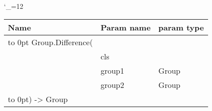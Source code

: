 \begingroup \catcode`\_=12 \tt
\begin{tabular}{lll}
\toprule
\textrm{Name}&\textrm{Param name}&\textrm{param type}\\
\midrule
\hbox to 0pt {Group.Difference(\hss}\\
& cls\\
& group1 & Group\\
& group2 & Group\\
\hbox to 0pt{) -> Group\hss}\\
\bottomrule
\end{tabular}
\endgroup
